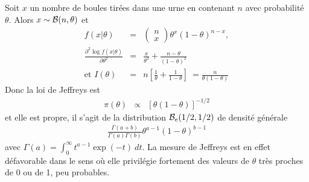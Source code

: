 \begin{rep}
Soit $x$ un nombre de boules tirées dans une urne en contenant $n$ avec probabilité $\theta$. Alors $x\sim {\cal{B}}(n,\theta)$ et
\begin{eqnarray*}
f(x|\theta) & = & \left(\begin{array}{c} n \\ x \end{array}\right) \theta^x (1-\theta)^{n-x}, \\
\frac{\partial^2 \log f(x|\theta)}{\partial \theta^2} & = & \frac{x}{\theta^2} + \frac{n-\theta}{(1-\theta)^2} \\
\text{et $I(\theta)$} & = & n\left[\frac{1}{\theta} + \frac{1}{1-\theta}\right] \ = \frac{n}{\theta(1-\theta)}
\end{eqnarray*}
Donc la loi de Jeffreys est
\begin{eqnarray*}
\pi(\theta) & \propto & [\theta(1-\theta)]^{-1/2}
\end{eqnarray*}
et elle est propre, il s'agit de la distribution ${\cal{B}}_e(1/2,1/2)$ de densité générale
\begin{eqnarray*}
\frac{\Gamma(a+b)}{\Gamma(a)\Gamma(b)} \theta^{a-1}(1-\theta)^{b-1}
\end{eqnarray*}
avec $\Gamma(a)=\int_{0}^{\infty} t^{a-1} \exp(-t) \ dt$. 
La mesure de Jeffreys est en effet défavorable dans le sens où elle privilégie fortement des valeurs de $\theta$ très proches de 0 ou de 1, peu probables. %
\end{rep}